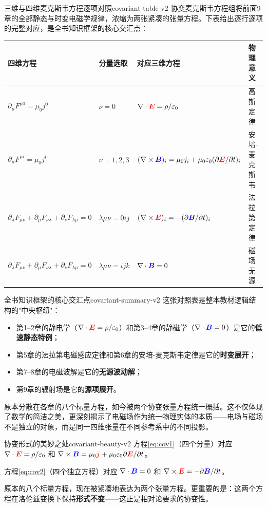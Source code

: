 \documentclass[11pt,a4paper,openany,oneside]{book}
\newcommand{\vecE}{\textcolor{red}{\vect{E}}}
\newcommand{\vecB}{\textcolor{blue}{\vect{B}}}
\newcommand{\vecJ}{\textcolor{cororange}{\vect{j}}}
\newcommand{\eps}{\varepsilon}
\newcommand{\muz}{\mu_0}
\newcommand{\vect}[1]{\bm{#1}}
\newcommand{\curl}{\nabla\times}
\newcommand{\divg}{\nabla\cdot}
\begin{document}
\begin{review}{三维与四维麦克斯韦方程逐项对照}{covariant-table-v2}
协变麦克斯韦方程组将前面9章的全部静态与时变电磁学规律，浓缩为两张紧凑的张量方程。下表给出逐行逐项的完整对应，是全书知识框架的核心交汇点：

\begin{center}
\small
\setlength{\tabcolsep}{2pt}
\begin{tabular}{@{}llll@{}}
\toprule
\textbf{四维方程} & \textbf{分量选取} & \textbf{对应三维方程} & \textbf{物理意义} \\
\midrule
$\partial_\mu F^{\mu 0}=\muz j^0$ & $\nu=0$ & $\divg\vecE=\rho/\eps_0$ & 高斯定律 \\
$\partial_\mu F^{\mu i}=\muz j^i$ & $\nu=1,2,3$ & $(\curl\vecB)_i=\muz j_i+\muz\eps_0(\partial\vecE/\partial t)_i$ & 安培-麦克斯韦 \\
$\partial_\lambda F_{\mu\nu}+\partial_\mu F_{\nu\lambda}+\partial_\nu F_{\lambda\mu}=0$ & $\lambda\mu\nu=0ij$ & $(\curl\vecE)_i=-(\partial\vecB/\partial t)_i$ & 法拉第定律 \\
$\partial_\lambda F_{\mu\nu}+\partial_\mu F_{\nu\lambda}+\partial_\nu F_{\lambda\mu}=0$ & $\lambda\mu\nu=ijk$ & $\divg\vecB=0$ & 磁场无源 \\
\bottomrule
\end{tabular}
\end{center}

\begin{insight}{全书知识框架的核心交汇点}{covariant-summary-v2}
这张对照表是整本教材逻辑结构的"中央枢纽"：
\begin{itemize}
\item 第1--2章的静电学（$\divg\vecE=\rho/\eps_0$）和第3--4章的静磁学（$\divg\vecB=0$）是它的\textbf{低速静态特例}；
\item 第5章的法拉第电磁感应定律和第6章的安培-麦克斯韦定律是它的\textbf{时变展开}；
\item 第7--8章的电磁波解是它的\textbf{无源波动解}；
\item 第9章的辐射场是它的\textbf{源项展开}。
\end{itemize}
原本分散在各章的八个标量方程，如今被两个协变张量方程统一概括。这不仅体现了数学的简洁之美，更深刻揭示了电磁场作为统一物理实体的本质——电场与磁场不是独立的对象，而是同一四维张量在不同参考系中的不同投影。
\end{insight}
\end{review}

\begin{insight}{协变形式的美妙之处}{covariant-beauty-v2}
方程\eqref{eq:cov1}（四个分量）对应 $\divg\vecE = \rho/\eps_0$ 和 $\curl\vecB = \muz\vecJ + \muz\eps_0\partial\vecE/\partial t$。

方程\eqref{eq:cov2}（四个独立方程）对应 $\divg\vecB = 0$ 和 $\curl\vecE = -\partial\vecB/\partial t$。

原本的八个标量方程，现在被紧凑地表达为两个张量方程。更重要的是：这两个方程在洛伦兹变换下保持\textbf{形式不变}——这正是相对论要求的协变性。
\end{insight}
\end{document}
